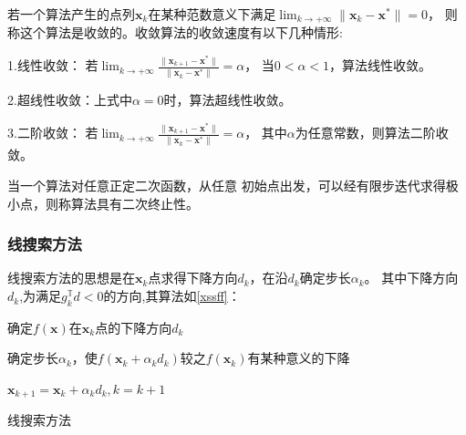 若一个算法产生的点列${\bm{x}_k}$在某种范数意义下满足$\displaystyle\lim_{k \to +\infty}\|\bm{x}_k-\bm{x}^*\|=0$，
则称这个算法是收敛的。收敛算法的收敛速度有以下几种情形:

1.线性收敛：
若$\displaystyle\lim_{k \to +\infty}\frac{\|\bm{x}_{k+1}-\bm{x}^*\|}{\|\bm{x}_k-\bm{x}^*\|}= \alpha$，
当$0 < \alpha < 1$，算法线性收敛。

2.超线性收敛：上式中$\alpha = 0$时，算法超线性收敛。

3.二阶收敛：
若$\displaystyle\lim_{k \to +\infty}\frac{\|\bm{x}_{k+1}-\bm{x}^*\|}{\|\bm{x}_k-\bm{x}^*\|}=\alpha$，
其中$\alpha$为任意常数，则算法二阶收敛。


    
    \begin{definition}[二次终止性]
        当一个算法对任意正定二次函数，从任意    初始点出发，可以经有限步迭代求得极小点，则称算法具有二次终止性。
    \end{definition}
    
\subsubsection{线搜索方法}
线搜索方法的思想是在$\bm{x}_k$点求得下降方向$d_k$，在沿$d_k$确定步长$\alpha_k$。
其中下降方向$d_k$,为满足$g_k^{\mathbb{T}}d<0$的方向,其算法如\ref{xssff}：

\begin{algorithm}\label{xssff}

    \SetAlgoLined

     {
        确定$f(\bm{x})$在$\bm{x}_k$点的下降方向$d_k$
        
        确定步长$\alpha_k$，使$f(\bm{x}_k + \alpha_kd_k)$较之$f(\bm{x}_k)$有某种意义的下降
        
        $\bm{x}_{k+1} = \bm{x}_k + \alpha_kd_k,k=k+1$
    }
    \caption{线搜索方法}
\end{algorithm}


